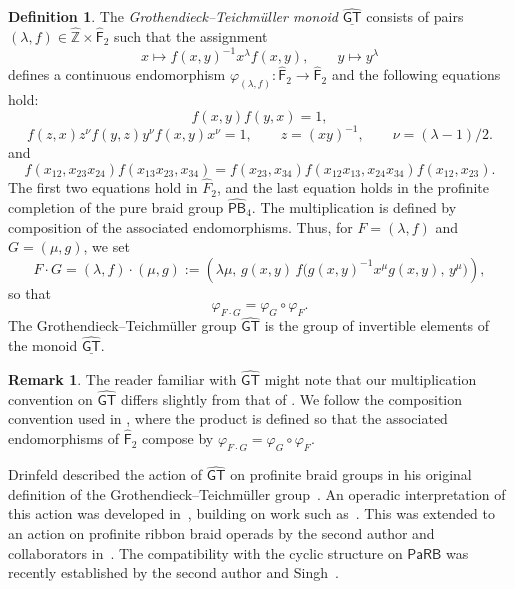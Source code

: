 \documentclass{amsart}
\newcommand{\F}{\mathsf{F}}
\newcommand{\PaRB}{\mathsf{PaRB}}
\newcommand{\GT}{\widehat{\mathsf{GT}}}
\newcommand{\PB}{\mathsf{PB}} %
\theoremstyle{definition}
\newtheorem{definition}[theorem]{Definition}%
\newtheorem{remark}[theorem]{Remark}%
\numberwithin{equation}{section}
\begin{document}
\begin{definition}\label{defn:GT}
The \emph{Grothendieck--Teichmüller monoid} $\underline{\GT}$ consists of pairs $(\lambda,f)\in \widehat{\mathbb Z}\times \widehat{\F}_2$ such that the assignment
\[
x\longmapsto f(x,y)^{-1}x^\lambda f(x,y),
\qquad
y\longmapsto y^\lambda
\]
defines a continuous endomorphism $\varphi_{(\lambda,f)}\colon \widehat{\F}_2\longrightarrow \widehat{\F}_2$
and the following equations hold:
\begin{equation}\label{I}\tag{I}
f(x,y)f(y,x)=1,
\end{equation}
\begin{equation}\label{II}\tag{II}
f(z,x)z^\nu f(y,z)y^\nu f(x,y)x^\nu=1,
\qquad
z=(xy)^{-1},
\qquad
\nu=(\lambda-1)/2.
\end{equation}
and
\begin{equation}\label{III}\tag{III}
f(x_{12},x_{23}x_{24})f(x_{13}x_{23},x_{34})
=
f(x_{23},x_{34})f(x_{12}x_{13},x_{24}x_{34})f(x_{12},x_{23}).
\end{equation}
The first two equations hold in \(\widehat F_2\), and the last equation holds
in the profinite completion of the pure braid group \(\widehat{\PB}_4\). The multiplication is defined by composition of the associated endomorphisms.
Thus, for \(F=(\lambda,f)\) and \(G=(\mu,g)\), we set
\[
F\cdot G
=
(\lambda,f)\cdot(\mu,g)
:=
\left(
\lambda\mu,\,
g(x,y)\,
f\bigl(g(x,y)^{-1}x^\mu g(x,y),\,y^\mu\bigr)
\right),
\]
so that
\[
\varphi_{F\cdot G}=\varphi_G\circ\varphi_F.
\]
The Grothendieck--Teichmüller group \(\GT\) is the group of invertible elements of the monoid \(\underline{\GT}\).

\end{definition}


\begin{remark}
The reader familiar with $\GT$ might note that our multiplication convention on $\GT$ differs slightly from that of \cite{Drin}. We follow the composition convention used in \cite{hls}, where the product is defined so that the associated endomorphisms of $\widehat{\F}_2$ compose by $\varphi_{F\cdot G}=\varphi_G\circ\varphi_F.$
\end{remark}

Drinfeld described the action of $\GT$ on profinite braid groups in his original definition of the Grothendieck--Teichmüller group~\cite{Drin}. An operadic interpretation of this action was developed in~\cite{Horel_profinite_groupoids}, building on work such as~\cite{BN,FresseBook1}. This was extended to an action on profinite ribbon braid operads by the second author and collaborators in~\cite{Boavida-Horel-Robertson}. The compatibility with the cyclic structure on $\PaRB$ was recently established by the second author and Singh~\cite{robertson2025grothendieck}.
\end{document}
